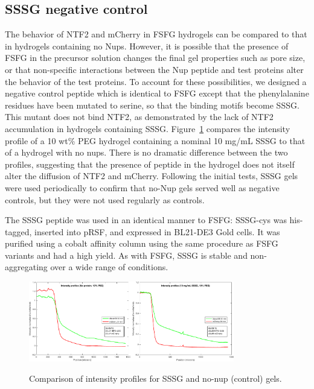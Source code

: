 \subsection{SSSG negative control}
The behavior of NTF2 and mCherry in FSFG hydrogels can be compared to that in hydrogels containing no Nups.  However, it is possible that the presence of FSFG in the precursor solution changes the final gel properties such as pore size, or that non-specific interactions between the Nup peptide and test proteins alter the behavior of the test proteins.  To account for these possibilities, we designed a negative control peptide which is identical to FSFG except that the phenylalanine residues have been mutated to serine, so that the binding motifs become SSSG.  This mutant does not bind NTF2, as demonstrated by the lack of NTF2 accumulation in hydrogels containing SSSG. Figure~\ref{fig:SSSG-control-comparison} compares the intensity profile of a 10 wt\% PEG hydrogel containing a nominal 10 mg/mL SSSG to that of a hydrogel with no nups.  There is no dramatic difference between the two profiles, suggesting that the presence of peptide in the hydrogel does not itself alter the diffusion of NTF2 and mCherry.  Following the initial tests, SSSG gels were used periodically to confirm that no-Nup gels served well as negative controls, but they were not used regularly as controls.

The SSSG peptide was used in an identical manner to FSFG: SSSG-cys was his-tagged, inserted into pRSF, and expressed in BL21-DE3 Gold cells.  It was purified using a cobalt affinity column using the same procedure as FSFG variants and had a high yield.  As with FSFG, SSSG is stable and non-aggregating over a wide range of conditions.
\begin{figure} %
\caption{Comparison of intensity profiles for SSSG and no-nup (control) gels.}
\centering
\includegraphics[width=0.8\textwidth]{figs/ch03/SSSG-control-comparison}
\label{fig:SSSG-control-comparison}
\end{figure} 
